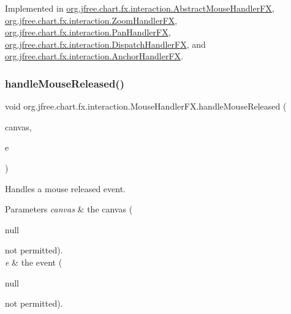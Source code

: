 Implemented in \mbox{\hyperlink{classorg_1_1jfree_1_1chart_1_1fx_1_1interaction_1_1_abstract_mouse_handler_f_x_a3e8a17fbf7481ed55e99759ab96746ef}{org.\+jfree.\+chart.\+fx.\+interaction.\+Abstract\+Mouse\+Handler\+FX}}, \mbox{\hyperlink{classorg_1_1jfree_1_1chart_1_1fx_1_1interaction_1_1_zoom_handler_f_x_a39eb9924bd9125f685df78a26fe8317d}{org.\+jfree.\+chart.\+fx.\+interaction.\+Zoom\+Handler\+FX}}, \mbox{\hyperlink{classorg_1_1jfree_1_1chart_1_1fx_1_1interaction_1_1_pan_handler_f_x_a216c7c8b3d280c17f29bf8d55188644b}{org.\+jfree.\+chart.\+fx.\+interaction.\+Pan\+Handler\+FX}}, \mbox{\hyperlink{classorg_1_1jfree_1_1chart_1_1fx_1_1interaction_1_1_dispatch_handler_f_x_aec52d7abb43d55b8cde1e459d20c7ffa}{org.\+jfree.\+chart.\+fx.\+interaction.\+Dispatch\+Handler\+FX}}, and \mbox{\hyperlink{classorg_1_1jfree_1_1chart_1_1fx_1_1interaction_1_1_anchor_handler_f_x_aae8e995d9a03393fb8eee9d45d81c23b}{org.\+jfree.\+chart.\+fx.\+interaction.\+Anchor\+Handler\+FX}}.

\mbox{\label{interfaceorg_1_1jfree_1_1chart_1_1fx_1_1interaction_1_1_mouse_handler_f_x_adbb7fa38b9913c536fb2a3ae09c70058}} 
\subsubsection{\texorpdfstring{handle\+Mouse\+Released()}{handleMouseReleased()}}
{\footnotesize\ttfamily void org.\+jfree.\+chart.\+fx.\+interaction.\+Mouse\+Handler\+F\+X.\+handle\+Mouse\+Released (\begin{DoxyParamCaption}\item[{\mbox{\hyperlink{classorg_1_1jfree_1_1chart_1_1fx_1_1_chart_canvas}{Chart\+Canvas}}}]{canvas,  }\item[{Mouse\+Event}]{e }\end{DoxyParamCaption})}

Handles a mouse released event.


\begin{DoxyParams}{Parameters}
{\em canvas} & the canvas (
\begin{DoxyCode}
null 
\end{DoxyCode}
 not permitted). \\
\hline
{\em e} & the event (
\begin{DoxyCode}
null 
\end{DoxyCode}
 not permitted). \\
\hline
\end{DoxyParams}


